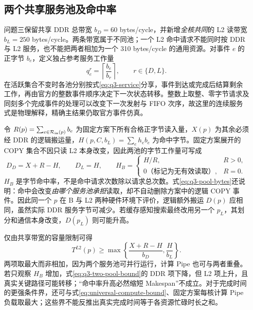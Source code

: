 \subsection{两个共享服务池及命中率}
问题三保留共享 DDR 总带宽 $b_D=60$ bytes/cycle，并新增\emph{全核共同}的 L2 读带宽 $b_L=250$ bytes/cycle。两条带宽属于不同池；一个 L2 命中请求不能同时按 DDR 与 L2 服务，也不能把两者相加为一个 310 bytes/cycle 的通用资源。对事件 $e$ 的正字节 $b_e$，定义独占参考服务工作量
\begin{equation}\label{eq:q3-exclusive-work}
q_e^r=\left\lceil\frac{b_e}{b_r}\right\rceil,
\qquad r\in\{D,L\}.
\end{equation}
在活跃集合不变时各池分别按式\eqref{eq:q3-service}分享，事件到达或完成后结算剩余工作，再由官方的整数事件顺序决定下一次状态转移。整数上取整、零字节请求及同刻多个完成事件的处理可以改变下一次发射与 FIFO 次序，故这里的连续服务式是物理解释，精确主结果仍取官方事件仿真。

令 $R(p)=\sum_{e\in\mathcal R_{\rm in}(p)}b_e$ 为固定方案下所有合格正字节读入量，$X(p)$ 为其余必须经 DDR 的逻辑搬运量，$H(p,C,b_L)=\sum_e h_e b_e$ 为命中字节。固定方案展开的 COPY 集合不因只读 L2 本身改变，因此两池的字节工作量可写成
\begin{equation}\label{eq:q3-pool-bytes}
D_D=X+R-H,\qquad D_L=H,\qquad
H_B=
\begin{cases}
H/R,&R>0,\\
0\text{（标记为无有效读取）},&R=0 .
\end{cases}
\end{equation}
$H_B$ 是字节命中率，不是命中请求次数除以请求总次数。式\eqref{eq:q3-pool-bytes}还说明：命中会改变\emph{由哪个服务池承担}读取，却不自动删除方案中的逻辑 COPY 事件。因此同一个 $p$ 在 B 与 L2 两种硬件环境下评价，逻辑额外搬运 $D(p)$ 应相同，虽然实际 DDR 服务字节可减少。若缓存感知搜索最终改用另一个 $p_L$，其划分和通信本身改变，$D(p_L)$ 则可能升高。

仅由共享带宽的容量限制可得
\begin{equation}\label{eq:q3-two-pool-bound}
T^{L2}(p)\ge
\max\left\{\frac{X+R-H}{b_D},\frac{H}{b_L}\right\}.
\end{equation}
两项取最大而非相加，因为两个服务池可并行运行，计算 Pipe 也可与两者重叠。若只观察 $H_B$ 增加，式\eqref{eq:q3-two-pool-bound}的 DDR 项下降，但 L2 项上升，且真实关键路径可能转移；“命中率升高必然缩短 Makespan”不成立。对于完成时间的更强条件界，还可与式\eqref{eq:universal-compute-bound}、固定方案每核计算 Pipe 负载取最大；这些界不能反推出真实完成时间等于各资源忙碌时长之和。


